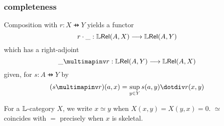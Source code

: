 \subsubsection{completeness}






Composition with $r:X\pfun Y$ yields a functor
$$
r\cdot \_ : \mathbb{L} \mathsf{Rel}(A,X)   \longrightarrow \mathbb{L} \mathsf{Rel}(A,Y)
$$
which
has a right-adjoint
$$
\_ \multimapinv r : \LREL(A,Y)   \longrightarrow \LREL(A,X)
$$
given, for $s:A\pfun Y$ by 
\begin{align*}
(s\multimapinv r)(a,x)= \sup_{y\in Y}s(a,y) \dotdiv r(x,y)
\end{align*}




%
%
%
%
%
%
%
%
%

For a $\mathbb{L}$-category $X$, we write $x\simeq y$ when $X(x,y)=X(y,x)=0$. $\simeq$ coincides with $=$ precisely when $x$ is skeletal.

